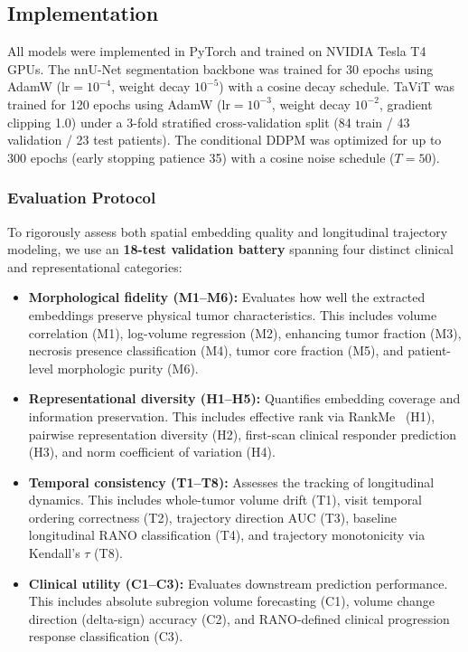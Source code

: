 \documentclass[conference]{IEEEtran}
\begin{document}
\subsection{Implementation}
\label{sec:implementation}

All models were implemented in PyTorch and trained on NVIDIA Tesla T4 GPUs. The nnU-Net segmentation backbone was trained for 30 epochs using AdamW ($\mathrm{lr}=10^{-4}$, weight decay $10^{-5}$) with a cosine decay schedule. TaViT was trained for 120 epochs using AdamW ($\mathrm{lr}=10^{-3}$, weight decay $10^{-2}$, gradient clipping 1.0) under a 3-fold stratified cross-validation split (84 train / 43 validation / 23 test patients). The conditional DDPM was optimized for up to 300 epochs (early stopping patience 35) with a cosine noise schedule ($T=50$).

\subsubsection{Evaluation Protocol}
\label{sec:eval_protocol}

To rigorously assess both spatial embedding quality and longitudinal trajectory modeling, we use an \textbf{18-test validation battery} spanning four distinct clinical and representational categories:
\begin{itemize}
    \item \textbf{Morphological fidelity (M1--M6):} Evaluates how well the extracted embeddings preserve physical tumor characteristics. This includes volume correlation (M1), log-volume regression (M2), enhancing tumor fraction (M3), necrosis presence classification (M4), tumor core fraction (M5), and patient-level morphologic purity (M6).
    \item \textbf{Representational diversity (H1--H5):} Quantifies embedding coverage and information preservation. This includes effective rank via RankMe~\cite{garrido2023rankme} (H1), pairwise representation diversity (H2), first-scan clinical responder prediction (H3), and norm coefficient of variation (H4).
    \item \textbf{Temporal consistency (T1--T8):} Assesses the tracking of longitudinal dynamics. This includes whole-tumor volume drift (T1), visit temporal ordering correctness (T2), trajectory direction AUC (T3), baseline longitudinal RANO classification (T4), and trajectory monotonicity via Kendall's $\tau$ (T8).
    \item \textbf{Clinical utility (C1--C3):} Evaluates downstream prediction performance. This includes absolute subregion volume forecasting (C1), volume change direction (delta-sign) accuracy (C2), and RANO-defined clinical progression response classification (C3).
\end{itemize}
\end{document}
